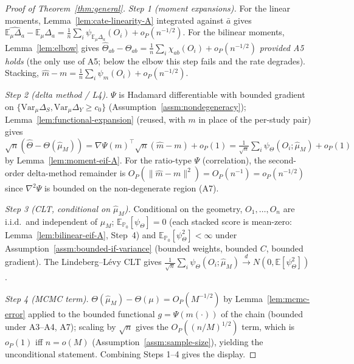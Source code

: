 \begin{proof}[Proof of Theorem~\ref{thm:general}]
\emph{Step 1 (moment expansions).} For the linear moments, Lemma~\ref{lem:cate-linearity-A}
integrated against $\bar a$ gives
$\widehat{\mathbb{E}_\mu\Delta_a}-\mathbb{E}_\mu\Delta_a=\frac1n\sum_i\psi_{\mathbb{E}_\mu\Delta_a}(O_i)+o_P(n^{-1/2})$.
For the bilinear moments, Lemma~\ref{lem:elbow} gives
$\hat\Theta_{ab}-\Theta_{ab}=\frac1n\sum_i\chi_{ab}(O_i)+o_P(n^{-1/2})$ \emph{provided A5 holds}
(the only use of A5; below the elbow this step fails and the rate degrades). Stacking,
$\hat m-m=\frac1n\sum_i\psi_m(O_i)+o_P(n^{-1/2})$.

\emph{Step 2 (delta method / L4).} $\Psi$ is Hadamard differentiable with bounded gradient on
$\{\mathrm{Var}_\mu\Delta_S,\mathrm{Var}_\mu\Delta_Y\ge c_0\}$ (Assumption~\ref{assm:nondegeneracy});
Lemma~\ref{lem:functional-expansion} (reused, with $m$ in place of the per-study pair) gives
$\sqrt n(\hat\Theta-\Theta(\hat\mu_M)) = \nabla\Psi(m)^\top\sqrt n(\hat m-m)+o_P(1)
= \frac1{\sqrt n}\sum_i\psi_\Theta(O_i;\hat\mu_M)+o_P(1)$ by Lemma~\ref{lem:moment-eif-A}. For the
ratio-type $\Psi$ (correlation), the second-order delta-method remainder is
$O_P(\|\hat m-m\|^2)=O_P(n^{-1})=o_P(n^{-1/2})$ since $\nabla^2\Psi$ is bounded on the
non-degenerate region (A7).

\emph{Step 3 (CLT, conditional on $\hat\mu_M$).} Conditional on the geometry, $O_1,\dots,O_n$ are
i.i.d.\ and independent of $\hat\mu_M$; $\mathbb{E}_{\mathbb{P}_0}[\psi_\Theta]=0$ (each stacked
score is mean-zero: Lemma~\ref{lem:bilinear-eif-A}, Step~4) and
$\mathbb{E}_{\mathbb{P}_0}[\psi_\Theta^2]<\infty$ under Assumption~\ref{assm:bounded-if-variance}
(bounded weights, bounded $C$, bounded gradient). The Lindeberg--L\'evy CLT gives
$\frac1{\sqrt n}\sum_i\psi_\Theta(O_i;\hat\mu_M)\xrightarrow{d}N(0,\mathbb{E}[\psi_\Theta^2])$.

\emph{Step 4 (MCMC term).} $\Theta(\hat\mu_M)-\Theta(\mu)=O_P(M^{-1/2})$ by
Lemma~\ref{lem:mcmc-error} applied to the bounded functional $g=\Psi(m(\cdot))$ of the chain
(bounded under A3--A4, A7); scaling by $\sqrt n$ gives the $O_P((n/M)^{1/2})$ term, which is
$o_P(1)$ iff $n=o(M)$ (Assumption~\ref{assm:sample-size}), yielding the unconditional statement.
Combining Steps 1--4 gives the display.
\end{proof}

